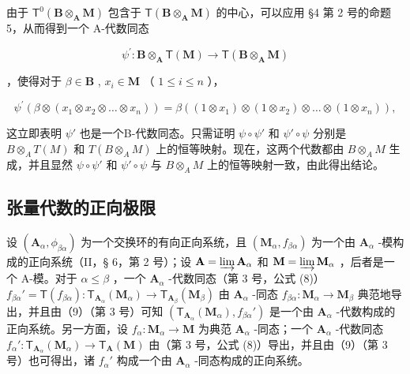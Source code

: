 由于 \(\mathsf{T}^0 (\mathbf{B}\otimes_{\mathbf{A}}\mathbf{M})\) 包含于 \(\mathsf{T}(\mathbf{B}\otimes_{\mathbf{A}}\mathbf{M})\) 的中心，可以应用 §4 第 2 号的命题 5，从而得到一个 A-代数同态

\[
\psi^ {\prime}: \mathbf {B} \otimes_ {\mathbf {A}} \mathsf {T} (\mathbf {M}) \rightarrow \mathsf {T} (\mathbf {B} \otimes_ {\mathbf {A}} \mathbf {M})
\]

，使得对于 \(\beta \in \mathbf{B}\) , \(x_{i} \in \mathbf{M}\) （ \(1 \leqslant i \leqslant n\) ），

\[
\psi^ {\prime} (\beta \otimes (x _ {1} \otimes x _ {2} \otimes \dots \otimes x _ {n})) = \beta ((1 \otimes x _ {1}) \otimes (1 \otimes x _ {2}) \otimes \dots \otimes (1 \otimes x _ {n})),
\]

这立即表明 \(\psi'\) 也是一个B-代数同态。只需证明 \(\psi \circ \psi'\) 和 \(\psi' \circ \psi\) 分别是 \(B \otimes_{A} T(M)\) 和 \(T(B \otimes_{A} M)\) 上的恒等映射。现在，这两个代数都由 \(B \otimes_{A} M\) 生成，并且显然 \(\psi \circ \psi'\) 和 \(\psi' \circ \psi\) 与 \(B \otimes_{A} M\) 上的恒等映射一致，由此得出结论。

\subsection{张量代数的正向极限}

设 \((\mathbf{A}_{\alpha},\phi_{\beta \alpha})\) 为一个交换环的有向正向系统，且 \((\mathbf{M}_{\alpha},f_{\beta \alpha})\) 为一个由 \(\mathbf{A}_{\alpha}\) -模构成的正向系统（II，§ 6，第 2 号）；设 \(\mathbf{A} = \varinjlim \mathbf{A}_{\alpha}\) 和 \(\mathbf{M} = \varinjlim \mathbf{M}_{\alpha}\) ，后者是一个 A-模。对于 \(\alpha \leqslant \beta\) ，一个 \(\mathbf{A}_{\alpha}\) -代数同态（第 3 号，公式 (8)） \(f_{\beta \alpha}' = \mathsf{T}(f_{\beta \alpha})\colon \mathsf{T}_{\mathbf{A}_{\alpha}}(\mathbf{M}_{\alpha})\to \mathsf{T}_{\mathbf{A}_{\beta}}(\mathbf{M}_{\beta})\) 由 \(\mathbf{A}_{\alpha}\) -同态 \(f_{\beta \alpha}\colon \mathbf{M}_{\alpha}\to \mathbf{M}_{\beta}\) 典范地导出，并且由（9）（第 3 号）可知 \((\mathsf{T}_{\mathbf{A}_{\alpha}}(\mathbf{M}_{\alpha}),f_{\beta \alpha}')\) 是一个由 \(\mathbf{A}_{\alpha}\) -代数构成的正向系统。另一方面，设 \(f_{\alpha}\colon \mathbf{M}_{\alpha}\to \mathbf{M}\) 为典范 \(\mathbf{A}_{\alpha}\) -同态；一个 \(\mathbf{A}_{\alpha}\) -代数同态 \(f_{\alpha}'\colon \mathsf{T}_{\mathbf{A}_{\alpha}}(\mathbf{M}_{\alpha})\to \mathsf{T}_{\mathbf{A}}(\mathbf{M})\) 由（第 3 号，公式 (8)）导出，并且由（9）（第 3 号）也可得出，诸 \(f_{\alpha}'\) 构成一个由 \(\mathbf{A}_{\alpha}\) -同态构成的正向系统。

